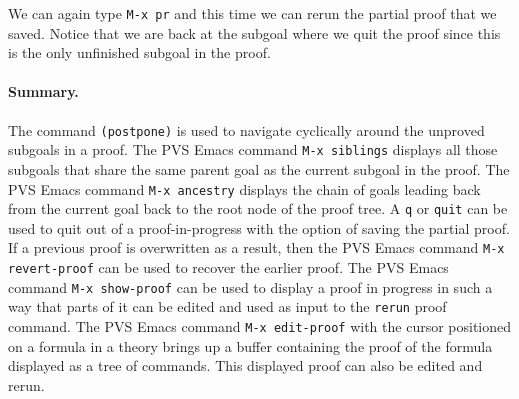 We can again type {\tt M-x pr} and this time we can rerun the partial
proof that we saved.  
Notice that we are back at the subgoal where we quit the proof
since this is the only unfinished subgoal in the proof.

\paragraph{Summary. }  The command {\tt (postpone)} is used to navigate
cyclically around the unproved subgoals in a proof.  The PVS Emacs
command {\tt M-x siblings} displays all those subgoals that share the
same parent goal as the current subgoal in the proof.  The PVS Emacs
command {\tt M-x ancestry} displays the chain of goals leading back from
the current goal back to the root node of the proof tree.  A {\tt q} or
{\tt quit} can be used to quit out of a proof-in-progress with the
option of saving the partial proof.  If a previous proof is overwritten
as a result, then the PVS Emacs command {\tt M-x revert-proof}
can be used to recover the earlier proof.  
The PVS Emacs command {\tt M-x show-proof} can be used to display a
proof in progress in such a way that parts of it can be edited and
used as input to the {\tt rerun} proof command.  The PVS Emacs command
{\tt M-x edit-proof} with the cursor positioned on a formula in a theory
brings up a buffer containing the proof of the formula displayed as a
tree of commands.  This displayed proof can also be edited and rerun.


